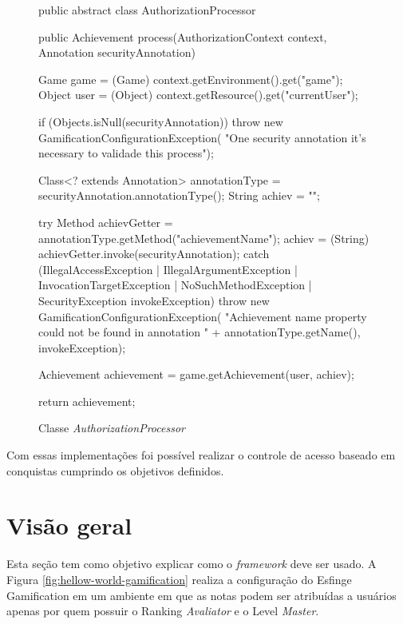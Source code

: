 \begin{figure}[H]
    \centering
    \caption{Classe \textit{AuthorizationProcessor}}
    \begin{java}
public abstract class AuthorizationProcessor {

	public Achievement process(AuthorizationContext context, Annotation securityAnnotation) {
		
		Game game = (Game) context.getEnvironment().get("game");
		Object user = (Object) context.getResource().get("currentUser");

		if (Objects.isNull(securityAnnotation))
			throw new GamificationConfigurationException(
					"One security annotation it's necessary to validade this process");

		Class<? extends Annotation> annotationType = securityAnnotation.annotationType();
		String achiev = "";

		try {
			Method achievGetter = annotationType.getMethod("achievementName");
			achiev = (String) achievGetter.invoke(securityAnnotation);
		} catch (IllegalAccessException | IllegalArgumentException | InvocationTargetException | NoSuchMethodException
				| SecurityException invokeException) {
			throw new GamificationConfigurationException(
					"Achievement name property could not be found in annotation " + annotationType.getName(),
					invokeException);
		}

		Achievement achievement = game.getAchievement(user, achiev);

		return achievement;
	}
}
    \end{java}
    \label{fig:authorization-processor}
\end{figure}

\par Com essas implementações foi possível realizar o controle de acesso baseado em conquistas cumprindo os objetivos definidos.

\section{Visão geral}

\par Esta seção tem como objetivo explicar como o \textit{framework} deve ser usado. A Figura \ref{fig:hellow-world-gamification} realiza a configuração do Esfinge Gamification em um ambiente em que as notas podem ser atribuídas a usuários apenas por quem possuir o Ranking \textit{Avaliator} e o Level \textit{Master}.


